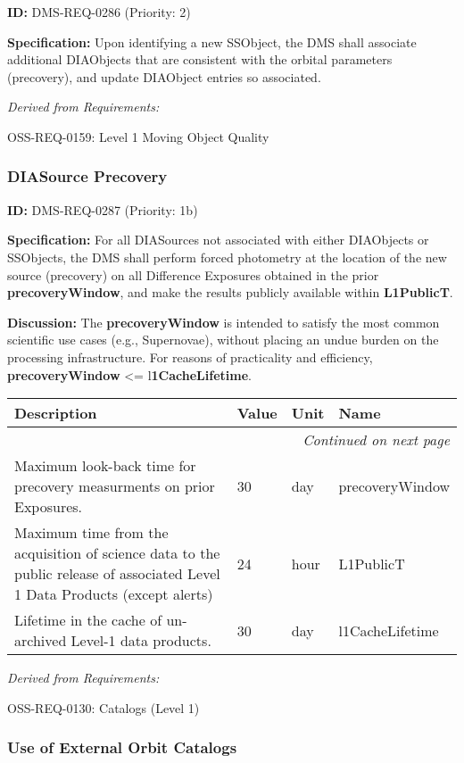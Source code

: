 \documentclass[SE,toc,lsstdraft]{lsstdoc}
\makeatletter
\newcommand{\paramname}[1]{\hspace{0pt}#1}
\newcommand{\unitname}[1]{\hspace{0pt}#1}
\newenvironment{parameters}[0]{%
\setlength\LTleft{0pt}
\setlength\LTright{\fill}
\begin{small}
\begin{longtable}[]{|p{0.49\textwidth}|l|p{0.6in}|p{1.70in}@{}|}

\hline \textbf{Description} & \textbf{Value} & \textbf{Unit} & \textbf{Name} \\ \hline
\endhead

\hline \multicolumn{4}{r}{\emph{Continued on next page}} \\
\endfoot

\hline\hline
\endlastfoot
}{%
\hline
\end{longtable}
\end{small}
}
\makeatother
\begin{document}
\label{DMS-REQ-0286}
\textbf{ID:} DMS-REQ-0286 (Priority: 2)

\textbf{Specification:} Upon identifying a new SSObject, the DMS shall associate additional DIAObjects that are consistent with the orbital parameters (precovery), and update DIAObject entries so associated.

\emph{Derived from Requirements:}

OSS-REQ-0159:
Level 1 Moving Object Quality \newline

\subsubsection{DIASource Precovery}

\label{DMS-REQ-0287}
\textbf{ID:} DMS-REQ-0287 (Priority: 1b)

\textbf{Specification:} For all DIASources not associated with either DIAObjects or SSObjects, the DMS shall perform forced photometry at the location of the new source (precovery) on all Difference Exposures obtained in the prior \textbf{precoveryWindow}, and make the results publicly available within \textbf{L1PublicT}.

\textbf{Discussion: }The \textbf{precoveryWindow }is intended to satisfy the most common scientific use cases (e.g., Supernovae), without placing an undue burden on the processing infrastructure.  For reasons of practicality and efficiency, \textbf{precoveryWindow }<= l\textbf{1CacheLifetime}.

\begin{parameters}
Maximum look-back time for precovery measurments on prior Exposures.
&
30
&
\unitname{%
day
}
&
\paramname{%
precoveryWindow
} \\\hline
Maximum time from the acquisition of science data to the public release of associated Level 1 Data Products (except alerts)
&
24
&
\unitname{%
hour
}
&
\paramname{%
L1PublicT
} \\\hline
Lifetime in the cache of un-archived Level-1 data products.
&
30
&
\unitname{%
day
}
&
\paramname{%
l1CacheLifetime
} \\\hline
\end{parameters}

\emph{Derived from Requirements:}

OSS-REQ-0130:
Catalogs (Level 1) \newline

\subsubsection{Use of External Orbit Catalogs}
\end{document}
